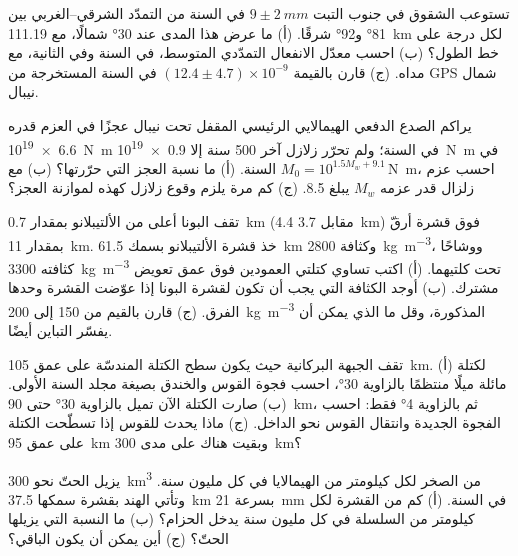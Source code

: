 \begin{exercise}[$\star\star$]\label{exo:b2:himalaya-andes:8}
تستوعب الشقوق في جنوب التبت $9 \pm \qty{2}{mm}$ في السنة من التمدّد الشرقي--الغربي بين
\ang{81} و\ang{92} شرقًا. (أ) ما عرض هذا المدى عند \ang{30} شمالًا، مع \qty{111.19}{km} لكل
درجة على خط الطول؟ (ب) احسب معدّل الانفعال التمدّدي المتوسط، في السنة وفي الثانية،
مع مداه. (ج) قارن بالقيمة $(12.4 \pm 4.7) \times 10^{-9}$ في السنة المستخرجة من GPS شمال نيبال.
\end{exercise}

\begin{exercise}[$\star\star$]\label{exo:b2:himalaya-andes:9}
يراكم الصدع الدفعي الهيمالايي الرئيسي المقفل تحت نيبال عجزًا في العزم قدره
\qty{6.6e19}{N.m} في السنة؛ ولم تحرّر زلازل آخر 500 سنة إلا
\qty{0.9e19}{N.m} في السنة. (أ) ما نسبة العجز التي حرّرتها؟ (ب) مع $M_0 =
10^{1.5 M_w + 9.1}$\,\unit{N.m}، احسب عزم زلزال قدر عزمه $M_w$ يبلغ 8.5. (ج) كم مرة
يلزم وقوع زلازل كهذه لموازنة العجز؟
\end{exercise}

\begin{exercise}[$\star\star\star$]\label{exo:b2:himalaya-andes:10}
تقف البونا أعلى من الألتيبلانو بمقدار \qty{0.7}{km} (4.4 مقابل \qty{3.7}{km}) فوق قشرة
أرقّ بمقدار \qty{11}{km}. خذ قشرة الألتيبلانو بسمك \qty{61.5}{km} وكثافة
\qty{2800}{kg.m^{-3}}، ووشاحًا كثافته \qty{3300}{kg.m^{-3}} تحت كلتيهما. (أ) اكتب
تساوي كتلتي العمودين فوق عمق تعويض مشترك. (ب) أوجد
الكثافة التي يجب أن تكون لقشرة البونا إذا عوّضت القشرة وحدها الفرق. (ج) قارن
بالقيم من 150 إلى \qty{200}{kg.m^{-3}} المذكورة، وقل ما الذي يمكن أن يفسّر التباين أيضًا.
\end{exercise}

\begin{exercise}[$\star\star\star$]\label{exo:b2:himalaya-andes:11}
تقف الجبهة البركانية حيث يكون سطح الكتلة المندسّة على عمق \qty{105}{km}. (أ) لكتلة
مائلة ميلًا منتظمًا بالزاوية \ang{30}، احسب فجوة القوس والخندق بصيغة مجلد السنة
الأولى. (ب) صارت الكتلة الآن تميل بالزاوية \ang{30} حتى \qty{90}{km}، ثم بالزاوية \ang{4} فقط: احسب
الفجوة الجديدة وانتقال القوس نحو الداخل. (ج) ماذا يحدث للقوس إذا تسطّحت الكتلة
على عمق \qty{95}{km} وبقيت هناك على مدى \qty{300}{km}؟
\end{exercise}

\begin{exercise}[$\star\star\star$]\label{exo:b2:himalaya-andes:12}
يزيل الحتّ نحو \qty{300}{km^3} من الصخر لكل كيلومتر من الهيمالايا في كل مليون سنة.
وتأتي الهند بقشرة سمكها \qty{37.5}{km} بسرعة \qty{21}{mm} في السنة. (أ) كم من القشرة لكل
كيلومتر من السلسلة في كل مليون سنة يدخل الحزام؟ (ب) ما النسبة التي يزيلها الحتّ؟
(ج) أين يمكن أن يكون الباقي؟
\end{exercise}

